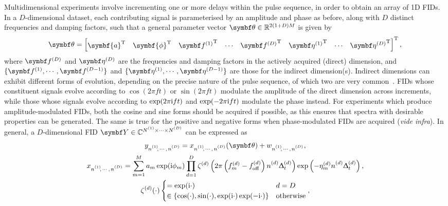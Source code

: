 Multidimensional experiments involve incrementing one or more delays within the
pulse sequence, in order to obtain an array of \ac{1D} \acp{FID}. In a
$D$-dimensional dataset, each contributing signal is parameterised by an
amplitude and phase as before, along with $D$ distinct frequencies and damping
factors, such that a general parameter vector  $\bth \in \mathbb{R}^{2(1+D)M}$
is given by
\begin{equation}
    \bth =
    \begin{bmatrix}
    \symbf{a}\T &
    \symbf{\phi}\T &
    {\bdfone}\T &
    \cdots &
    {\bdfD}\T &
    {\bdetaone}\T &
    \cdots &
    {\bdetaD}\T
    \end{bmatrix}\T,
    \label{eq:theta}
\end{equation}
where $\bdfD$ and $\bdetaD$ are the frequencies and damping factors in the
actively acquired (direct) dimension, and $\lbrace \bdfone, \cdots,
\bdfDminusone \rbrace$ and
$\lbrace \bdetaone, \cdots, \bdetaDminusone \rbrace$ are those for the indirect
dimension(s).
Indirect dimensions can exhibit different forms of evolution, depending on
the precise nature of the pulse sequence, of which two are very
common~\cite[Section 4.3.4]{Cavanagh2007}. \acp{FID} whose constituent signals
evolve according to $\cos(2 \pi f t)$ or $\sin(2 \pi f t)$ modulate the
amplitude of the direct dimension across increments, while those whose signals
evolve according to $\exp(2 \pi \mathrm{i} f t)$ and $\exp(-2 \pi \mathrm{i} f t)$ modulate
the phase instead.
For experiments which produce amplitude-modulated \acp{FID},
both the cosine and sine forms should be acquired if possible, as this ensures
that spectra with desirable properties can be generated. The same is true for the positive
and negative forms when phase-modulated \acp{FID} are acquired (\emph{vide
infra}). In general, a $D$-dimensional \ac{FID} $\bY \in \mathbb{C}^{\None
\times \cdots \times \ND}$ can be expressed as
\begin{subequations}
    \begin{gather}
        \ynonenD = \xnonenD(\bth) + \wnonenD,\\
        \xnonenD
            = \sumM \amexpphim \prodD
            \zeta^{(d)}\left(2 \pi \left(f^{(d)}_m  - \foffd\right) \nd \Dtd\right)
            \exp\left(-\eta^{(d)}_m \nd \Dtd\right),\\
        \zeta^{(d)}(\cdot)
        \begin{cases}
            = \exp(\iu\cdot) & d = D \\
            \in \left\lbrace \cos(\cdot), \sin(\cdot), \exp(\iu\cdot) \exp(-\iu\cdot)\right\rbrace & \text{otherwise}
        \end{cases},
    \end{gather}
    \label{eq:general-fid}%
\end{subequations}%

